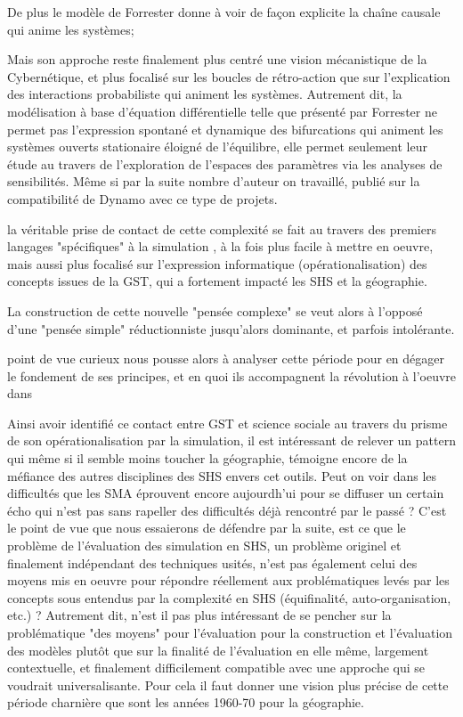 De plus le modèle de Forrester donne à voir de façon explicite la chaîne causale qui anime les systèmes;

Mais son approche reste finalement plus centré une vision mécanistique de la Cybernétique, et plus focalisé sur les boucles de rétro-action que sur l'explication des interactions probabiliste qui animent les systèmes. Autrement dit, la modélisation à base d'équation différentielle telle que présenté par Forrester ne permet pas l'expression spontané et dynamique des bifurcations qui animent les systèmes ouverts stationaire éloigné de l'équilibre, elle permet seulement leur étude au travers de l'exploration de l'espaces des paramètres via les analyses de sensibilités. Même si par la suite nombre d'auteur on travaillé, publié sur la compatibilité de Dynamo avec ce type de projets.


la véritable prise de contact de cette complexité se fait au travers des premiers langages "spécifiques" à la simulation , à la fois plus facile à mettre en oeuvre, mais aussi plus focalisé sur l'expression informatique (opérationalisation) des concepts issues de la GST, qui a fortement impacté les SHS et la géographie. 



La construction de cette nouvelle "pensée complexe" \autocite{Morin1990} se veut alors à l'opposé d'une "pensée simple" réductionniste jusqu'alors dominante, et parfois intolérante. 


 point de vue curieux nous pousse alors à analyser cette période pour en dégager le fondement de ses principes, et en quoi ils accompagnent la révolution à l'oeuvre dans 

Ainsi avoir identifié ce contact entre GST et science sociale au travers du prisme de son opérationalisation par la simulation, il est intéressant de relever un pattern qui même si il semble moins toucher la géographie, témoigne encore de la méfiance des autres disciplines des SHS envers cet outils. Peut on voir dans les difficultés que les SMA éprouvent encore aujourdh'ui pour se diffuser un certain écho qui n'est pas sans rapeller des difficultés déjà rencontré par le passé ? C'est le point de vue que nous essaierons de défendre par la suite, est ce que le problème de l'évaluation des simulation en SHS, un problème originel et finalement indépendant des techniques usités, n'est pas également celui des moyens mis en oeuvre pour répondre réellement aux problématiques levés par les concepts sous entendus par la complexité en SHS (équifinalité, auto-organisation, etc.)  ? Autrement dit, n'est il pas plus intéressant de se pencher sur la problématique "des moyens" pour l'évaluation pour la construction et l'évaluation des modèles plutôt que sur la finalité de l'évaluation en elle même, largement contextuelle, et finalement difficilement compatible avec une approche qui se voudrait universalisante. Pour cela il faut donner une vision plus précise de cette période charnière que sont les années 1960-70 pour la géographie. 


